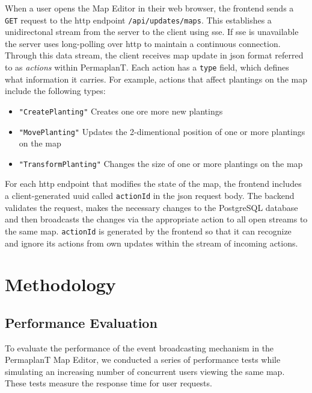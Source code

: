 \documentclass[final,draft]{vutinfth} %
\begin{document}
When a user opens the Map Editor in their web browser, the frontend sends a \texttt{GET} request to the \gls{http} endpoint \texttt{/api/updates/maps}.
This establishes a unidirectonal stream from the server to the client using \gls{sse}.
If \gls{sse} is unavailable the server uses long-polling over \gls{http} to maintain a continuous connection.
Through this data stream, the client receives map update in \gls{json} format referred to as \emph{actions} within PermaplanT.
Each action has a \texttt{type} field, which defines what information it carries.
For example, actions that affect plantings on the map include the following types:
\begin{itemize}
    \item \texttt{"CreatePlanting"} Creates one ore more new plantings
    \item \texttt{"MovePlanting"} Updates the 2-dimentional position of one or more plantings on the map
    \item\texttt{"TransformPlanting"} Changes the size of one or more plantings on the map
\end{itemize}

For each \gls{http} endpoint that modifies the state of the map, the frontend includes a client-generated \gls{uuid} called \texttt{actionId} in the \gls{json} request body.
The backend validates the request, makes the necessary changes to the PostgreSQL database and then broadcasts the changes via the appropriate action to all open streams to the same map.
\texttt{actionId} is generated by the frontend so that it can recognize and ignore its actions from own updates within the stream of incoming actions.


\chapter{Methodology}

\section{Performance Evaluation}

To evaluate the performance of the event broadcasting mechanism in the PermaplanT Map Editor, we conducted a series of performance tests while simulating an increasing number of concurrent users viewing the same map.
These tests measure the response time for user requests.
\end{document}
